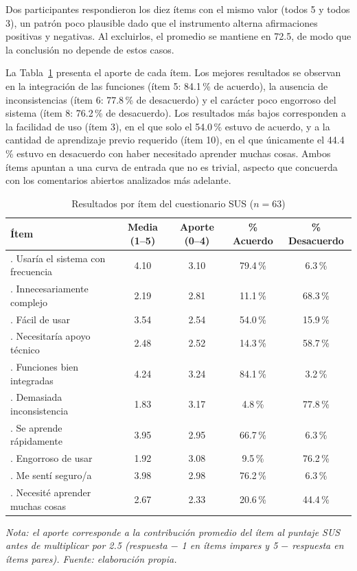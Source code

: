 Dos participantes respondieron los diez ítems con el mismo valor (todos 5 y todos 3), un patrón poco plausible dado que el instrumento alterna afirmaciones positivas y negativas. Al excluirlos, el promedio se mantiene en 72.5, de modo que la conclusión no depende de estos casos.

La Tabla~\ref{tabla:sus_items} presenta el aporte de cada ítem. Los mejores resultados se observan en la integración de las funciones (ítem 5: 84.1\,\% de acuerdo), la ausencia de inconsistencias (ítem 6: 77.8\,\% de desacuerdo) y el carácter poco engorroso del sistema (ítem 8: 76.2\,\% de desacuerdo). Los resultados más bajos corresponden a la facilidad de uso (ítem 3), en el que solo el 54.0\,\% estuvo de acuerdo, y a la cantidad de aprendizaje previo requerido (ítem 10), en el que únicamente el 44.4\,\% estuvo en desacuerdo con haber necesitado aprender muchas cosas. Ambos ítems apuntan a una curva de entrada que no es trivial, aspecto que concuerda con los comentarios abiertos analizados más adelante.

\begin{table}[H]
  \centering
  \caption{Resultados por ítem del cuestionario SUS ($n = 63$)}
  \label{tabla:sus_items}
  \footnotesize
  \setlength{\tabcolsep}{4pt}
  \begin{tabular}{>{\raggedright\arraybackslash}p{6.6cm} c c c c}
    \hline
    \textbf{Ítem} & \textbf{Media (1--5)} & \textbf{Aporte (0--4)} & \textbf{\% Acuerdo} & \textbf{\% Desacuerdo} \\
    \hline
    1. Usaría el sistema con frecuencia & 4.10 & 3.10 & 79.4\,\% & 6.3\,\% \\
    2. Innecesariamente complejo & 2.19 & 2.81 & 11.1\,\% & 68.3\,\% \\
    3. Fácil de usar & 3.54 & 2.54 & 54.0\,\% & 15.9\,\% \\
    4. Necesitaría apoyo técnico & 2.48 & 2.52 & 14.3\,\% & 58.7\,\% \\
    5. Funciones bien integradas & 4.24 & 3.24 & 84.1\,\% & 3.2\,\% \\
    6. Demasiada inconsistencia & 1.83 & 3.17 & 4.8\,\% & 77.8\,\% \\
    7. Se aprende rápidamente & 3.95 & 2.95 & 66.7\,\% & 6.3\,\% \\
    8. Engorroso de usar & 1.92 & 3.08 & 9.5\,\% & 76.2\,\% \\
    9. Me sentí seguro/a & 3.98 & 2.98 & 76.2\,\% & 6.3\,\% \\
    10. Necesité aprender muchas cosas & 2.67 & 2.33 & 20.6\,\% & 44.4\,\% \\
    \hline
  \end{tabular}

  \vskip 4pt
  \footnotesize\textit{Nota: el aporte corresponde a la contribución promedio del ítem al puntaje SUS antes de multiplicar por 2.5 (respuesta $-$ 1 en ítems impares y 5 $-$ respuesta en ítems pares). Fuente: elaboración propia.}
\end{table}

